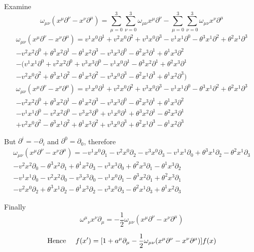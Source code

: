 \documentclass{article}
\begin{document}
Examine \[\omega_{\mu\nu} (x^\mu \partial^\nu-x^\nu \partial^\mu)=\sum^3_{\mu=0}\sum^3_{\nu=0}\omega_{\mu\nu} x^\mu \partial^\nu-\sum^3_{\mu=0}\sum^3_{\nu=0}\omega_{\mu\nu} x^\nu \partial^\mu\]
\begin{multline*}
	\omega_{\mu\nu} (x^\mu \partial^\nu-x^\nu \partial^\mu)=
	v^1 x^0 \partial^1+v^2 x^0 \partial^2+v^3 x^0 \partial^3
	-v^1 x^1 \partial^0-\theta^3 x^1 \partial^2+\theta^2 x^1 \partial^3\\ 
	-v^2 x^2 \partial^0+\theta^3 x^2 \partial^1-\theta^1 x^2 \partial^3
	-v^3 x^3 \partial^0-\theta^2 x^3 \partial^1+\theta^1 x^3 \partial^2\\-
	(v^1 x^1 \partial^0+v^2 x^2 \partial^0+v^3 x^3 \partial^0
	-v^1 x^0 \partial^1-\theta^3 x^2 \partial^1+\theta^2 x^3 \partial^1\\ 
	-v^2 x^0 \partial^2+\theta^3 x^1 \partial^2-\theta^1 x^3 \partial^2
	-v^3 x^0 \partial^3-\theta^2 x^1 \partial^3+\theta^1 x^2 \partial^3)\end{multline*}
\begin{multline*}
	\omega_{\mu\nu} (x^\mu \partial^\nu-x^\nu \partial^\mu)=
	v^1 x^0 \partial^1+v^2 x^0 \partial^2+v^3 x^0 \partial^3
	-v^1 x^1 \partial^0-\theta^3 x^1 \partial^2+\theta^2 x^1 \partial^3\\ 
	-v^2 x^2 \partial^0+\theta^3 x^2 \partial^1-\theta^1 x^2 \partial^3
	-v^3 x^3 \partial^0-\theta^2 x^3 \partial^1+\theta^1 x^3 \partial^2\\
	-v^1 x^1 \partial^0-v^2 x^2 \partial^0-v^3 x^3 \partial^0
	+v^1 x^0 \partial^1+\theta^3 x^2 \partial^1-\theta^2 x^3 \partial^1\\ 
	+v^2 x^0 \partial^2-\theta^3 x^1 \partial^2+\theta^1 x^3 \partial^2
	+v^3 x^0 \partial^3+\theta^2 x^1 \partial^3-\theta^1 x^2 \partial^3\end{multline*}

But $\partial^i=-\partial_i$ and $\partial^0=\partial_0$, therefore
\begin{multline*}
	\omega_{\mu\nu} (x^\mu \partial^\nu-x^\nu \partial^\mu)=
	-v^1 x^0 \partial_1-v^2 x^0 \partial_2-v^3 x^0 \partial_3
	-v^1 x^1 \partial_0+\theta^3 x^1 \partial_2-\theta^2 x^1 \partial_3\\ 
	-v^2 x^2 \partial_0-\theta^3 x^2 \partial_1+\theta^1 x^2 \partial_3
	-v^3 x^3 \partial_0+\theta^2 x^3 \partial_1-\theta^1 x^3 \partial_2\\
	-v^1 x^1 \partial_0-v^2 x^2 \partial_0-v^3 x^3 \partial_0
	-v^1 x^0 \partial_1-\theta^3 x^2 \partial_1+\theta^2 x^3 \partial_1\\ 
	-v^2 x^0 \partial_2+\theta^3 x^1 \partial_2-\theta^1 x^3 \partial_2
	-v^3 x^0 \partial_3-\theta^2 x^1 \partial_3+\theta^1 x^2 \partial_3\end{multline*}

Finally
\[{\omega^\mu}_\nu x^\nu \partial_\mu=-\frac{1}{2}\omega_{\mu\nu} (x^\mu \partial^\nu-x^\nu \partial^\mu)\]

\[\qq*{Hence } f(x^\prime)  = [1+a^\mu \partial_\mu -\frac{1}{2}\omega_{\mu\nu} (x^\mu \partial^\nu-x^\nu \partial^\mu)] f(x)\]
\end{document}

